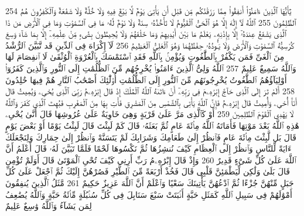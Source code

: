 {\tiny\colorbox{cl_aya}{254}} يَٰٓأَيُّهَا ٱلَّذِينَ ءَامَنُوٓا۟ أَنفِقُوا۟ مِمَّا رَزَقْنَٰكُم مِّن قَبْلِ أَن يَأْتِىَ يَوْمٌ لَّا بَيْعٌ فِيهِ وَلَا خُلَّةٌ وَلَا شَفَٰعَةٌ وَٱلْكَٰفِرُونَ هُمُ ٱلظَّٰلِمُونَ
{\tiny\colorbox{cl_aya}{255}} ٱللَّهُ لَآ إِلَٰهَ إِلَّا هُوَ ٱلْحَىُّ ٱلْقَيُّومُ لَا تَأْخُذُهُۥ سِنَةٌ وَلَا نَوْمٌ لَّهُۥ مَا فِى ٱلسَّمَٰوَٰتِ وَمَا فِى ٱلْأَرْضِ مَن ذَا ٱلَّذِى يَشْفَعُ عِندَهُۥٓ إِلَّا بِإِذْنِهِۦ يَعْلَمُ مَا بَيْنَ أَيْدِيهِمْ وَمَا خَلْفَهُمْ وَلَا يُحِيطُونَ بِشَىْءٍ مِّنْ عِلْمِهِۦٓ إِلَّا بِمَا شَآءَ وَسِعَ كُرْسِيُّهُ ٱلسَّمَٰوَٰتِ وَٱلْأَرْضَ وَلَا يَـُٔودُهُۥ حِفْظُهُمَا وَهُوَ ٱلْعَلِىُّ ٱلْعَظِيمُ
{\tiny\colorbox{cl_aya}{256}} لَآ إِكْرَاهَ فِى ٱلدِّينِ قَد تَّبَيَّنَ ٱلرُّشْدُ مِنَ ٱلْغَىِّ فَمَن يَكْفُرْ بِٱلطَّٰغُوتِ وَيُؤْمِنۢ بِٱللَّهِ فَقَدِ ٱسْتَمْسَكَ بِٱلْعُرْوَةِ ٱلْوُثْقَىٰ لَا ٱنفِصَامَ لَهَا وَٱللَّهُ سَمِيعٌ عَلِيمٌ
{\tiny\colorbox{cl_aya}{257}} ٱللَّهُ وَلِىُّ ٱلَّذِينَ ءَامَنُوا۟ يُخْرِجُهُم مِّنَ ٱلظُّلُمَٰتِ إِلَى ٱلنُّورِ وَٱلَّذِينَ كَفَرُوٓا۟ أَوْلِيَآؤُهُمُ ٱلطَّٰغُوتُ يُخْرِجُونَهُم مِّنَ ٱلنُّورِ إِلَى ٱلظُّلُمَٰتِ أُو۟لَٰٓئِكَ أَصْحَٰبُ ٱلنَّارِ هُمْ فِيهَا خَٰلِدُونَ
{\tiny\colorbox{cl_aya}{258}} أَلَمْ تَرَ إِلَى ٱلَّذِى حَآجَّ إِبْرَٰهِۦمَ فِى رَبِّهِۦٓ أَنْ ءَاتَىٰهُ ٱللَّهُ ٱلْمُلْكَ إِذْ قَالَ إِبْرَٰهِۦمُ رَبِّىَ ٱلَّذِى يُحْىِۦ وَيُمِيتُ قَالَ أَنَا۠ أُحْىِۦ وَأُمِيتُ قَالَ إِبْرَٰهِۦمُ فَإِنَّ ٱللَّهَ يَأْتِى بِٱلشَّمْسِ مِنَ ٱلْمَشْرِقِ فَأْتِ بِهَا مِنَ ٱلْمَغْرِبِ فَبُهِتَ ٱلَّذِى كَفَرَ وَٱللَّهُ لَا يَهْدِى ٱلْقَوْمَ ٱلظَّٰلِمِينَ
{\tiny\colorbox{cl_aya}{259}} أَوْ كَٱلَّذِى مَرَّ عَلَىٰ قَرْيَةٍ وَهِىَ خَاوِيَةٌ عَلَىٰ عُرُوشِهَا قَالَ أَنَّىٰ يُحْىِۦ هَٰذِهِ ٱللَّهُ بَعْدَ مَوْتِهَا فَأَمَاتَهُ ٱللَّهُ مِا۟ئَةَ عَامٍ ثُمَّ بَعَثَهُۥ قَالَ كَمْ لَبِثْتَ قَالَ لَبِثْتُ يَوْمًا أَوْ بَعْضَ يَوْمٍ قَالَ بَل لَّبِثْتَ مِا۟ئَةَ عَامٍ فَٱنظُرْ إِلَىٰ طَعَامِكَ وَشَرَابِكَ لَمْ يَتَسَنَّهْ وَٱنظُرْ إِلَىٰ حِمَارِكَ وَلِنَجْعَلَكَ ءَايَةً لِّلنَّاسِ وَٱنظُرْ إِلَى ٱلْعِظَامِ كَيْفَ نُنشِزُهَا ثُمَّ نَكْسُوهَا لَحْمًا فَلَمَّا تَبَيَّنَ لَهُۥ قَالَ أَعْلَمُ أَنَّ ٱللَّهَ عَلَىٰ كُلِّ شَىْءٍ قَدِيرٌ
{\tiny\colorbox{cl_aya}{260}} وَإِذْ قَالَ إِبْرَٰهِۦمُ رَبِّ أَرِنِى كَيْفَ تُحْىِ ٱلْمَوْتَىٰ قَالَ أَوَلَمْ تُؤْمِن قَالَ بَلَىٰ وَلَٰكِن لِّيَطْمَئِنَّ قَلْبِى قَالَ فَخُذْ أَرْبَعَةً مِّنَ ٱلطَّيْرِ فَصُرْهُنَّ إِلَيْكَ ثُمَّ ٱجْعَلْ عَلَىٰ كُلِّ جَبَلٍ مِّنْهُنَّ جُزْءًا ثُمَّ ٱدْعُهُنَّ يَأْتِينَكَ سَعْيًا وَٱعْلَمْ أَنَّ ٱللَّهَ عَزِيزٌ حَكِيمٌ
{\tiny\colorbox{cl_aya}{261}} مَّثَلُ ٱلَّذِينَ يُنفِقُونَ أَمْوَٰلَهُمْ فِى سَبِيلِ ٱللَّهِ كَمَثَلِ حَبَّةٍ أَنۢبَتَتْ سَبْعَ سَنَابِلَ فِى كُلِّ سُنۢبُلَةٍ مِّا۟ئَةُ حَبَّةٍ وَٱللَّهُ يُضَٰعِفُ لِمَن يَشَآءُ وَٱللَّهُ وَٰسِعٌ عَلِيمٌ
